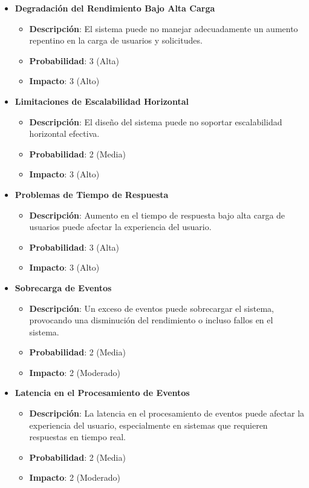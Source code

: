 \begin{itemize}
    \item \textbf{Degradación del Rendimiento Bajo Alta Carga}
          \begin{itemize}
              \item \textbf{Descripción}: El sistema puede no manejar adecuadamente un aumento repentino en la carga de usuarios y solicitudes.
              \item \textbf{Probabilidad}: 3 (Alta)
              \item \textbf{Impacto}: 3 (Alto)
          \end{itemize}

    \item \textbf{Limitaciones de Escalabilidad Horizontal}
          \begin{itemize}
              \item \textbf{Descripción}: El diseño del sistema puede no soportar escalabilidad horizontal efectiva.
              \item \textbf{Probabilidad}: 2 (Media)
              \item \textbf{Impacto}: 3 (Alto)
          \end{itemize}

    \item \textbf{Problemas de Tiempo de Respuesta}
          \begin{itemize}
              \item \textbf{Descripción}: Aumento en el tiempo de respuesta bajo alta carga de usuarios puede afectar la experiencia del usuario.
              \item \textbf{Probabilidad}: 3 (Alta)
              \item \textbf{Impacto}: 3 (Alto)
          \end{itemize}

    \item \textbf{Sobrecarga de Eventos}
          \begin{itemize}
              \item \textbf{Descripción}: Un exceso de eventos puede sobrecargar el sistema, provocando una disminución del rendimiento o incluso fallos en el sistema.
              \item \textbf{Probabilidad}: 2 (Media)
              \item \textbf{Impacto}: 2 (Moderado)
          \end{itemize}

    \item \textbf{Latencia en el Procesamiento de Eventos}
          \begin{itemize}
              \item \textbf{Descripción}: La latencia en el procesamiento de eventos puede afectar la experiencia del usuario, especialmente en sistemas que requieren respuestas en tiempo real.
              \item \textbf{Probabilidad}: 2 (Media)
              \item \textbf{Impacto}: 2 (Moderado)
          \end{itemize}
\end{itemize}

